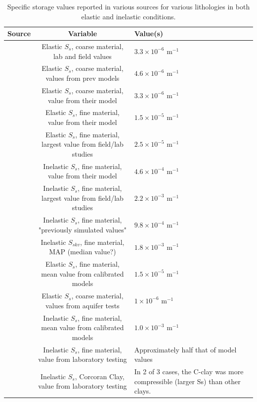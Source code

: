 \documentclass{article}
\begin{document}
\begin{table}[h]
\centering
\begin{tabular}{|c|c|p{4cm}|} 
\hline
\textbf{Source} & \textbf{Variable} & \textbf{Value(s)}\\ 
\hline
\cite{faunt_groundwater_2009} & Elastic $S_s$, coarse material, lab and field values & $3.3 \times 10^{-6}$ m$^{-1}$ \\
\hline 
\cite{faunt_groundwater_2009} & Elastic $S_s$, coarse material, values from prev models & $4.6 \times 10^{-6}$ m$^{-1}$\\
\hline
\cite{faunt_groundwater_2009} & Elastic $S_s$, coarse material, value from their model & $3.3 \times 10^{-6}$ m$^{-1}$ \\
\hline
\cite{faunt_groundwater_2009} & Elastic $S_s$, fine material, value from their model & $1.5 \times 10^{-5}$ m$^{-1}$ \\
\hline
\cite{faunt_groundwater_2009} & Elastic $S_s$, fine material, largest value from field/lab studies & $2.5 \times 10^{-5}$ m$^{-1}$ \\
\hline
\cite{faunt_groundwater_2009} & Inelastic $S_s$, fine material, value from their model & $4.6 \times 10^{-4}$ m$^{-1}$ \\
\hline
\cite{faunt_groundwater_2009} & Inelastic $S_s$, fine material, largest value from field/lab studies & $2.2 \times 10^{-3}$ m$^{-1}$ \\
\hline 
\cite{faunt_groundwater_2009} & Inelastic $S_s$, fine material, "previously simulated values" & $9.8 \times 10^{-4}$ m$^{-1}$ \\
\hline 
\cite{smith_modeling_2019} & Inelastic $S_{skv}$, fine material, MAP (median value?) & $1.8 \times 10^{-3}$ m$^{-1}$ \\
\hline
\cite{sneed_hydraulic_2001} & Elastic $S_s$, fine material, mean value from calibrated models & $1.5 \times 10^{-5}$ m$^{-1}$ \\
\hline
\cite{sneed_hydraulic_2001} & Elastic $S_s$, coarse material, values from aquifer tests & $1 \times 10^{-6}$ m$^{-1}$\\
\hline
\cite{sneed_hydraulic_2001} & Inelastic $S_s$, fine material, mean value from calibrated models & $1.0 \times 10^{-3}$ m$^{-1}$ \\
\hline
\cite{sneed_hydraulic_2001} & Inelastic $S_s$, fine material, value from laboratory testing & Approximately half that of model values \\
\hline
\cite{sneed_hydraulic_2001} & Inelastic $S_s$, Corcoran Clay, value from laboratory testing & In 2 of 3 cases, the C-clay was more compressible (larger Ss) than other clays. \\
\hline
\end{tabular}
\caption{Specific storage values reported in various sources for various lithologies in both elastic and inelastic conditions.}
\label{table:Ss-values}
\end{table}
\end{document}
